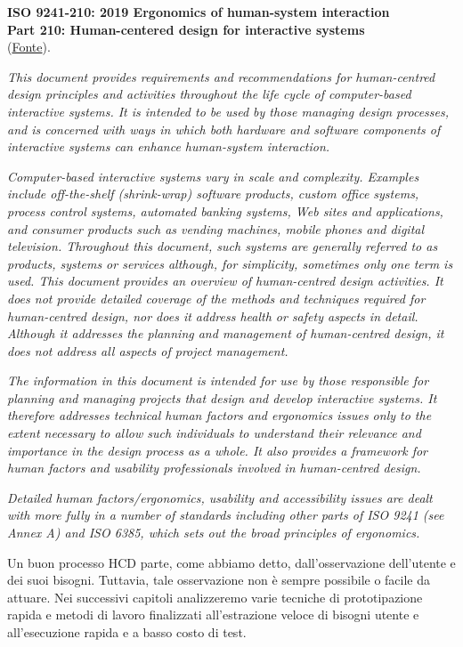 \vspace{\baselineskip}
\textbf{ISO 9241-210: 2019 Ergonomics of human-system interaction \\Part 210: Human-centered design for interactive systems}
\\(\href{https://www.iso.org/standard/77520.html}{Fonte}).
\vspace{\baselineskip}

\textit{This document provides requirements and recommendations for human-centred design principles and activities throughout the life cycle of
computer-based interactive systems. It is intended to be used by those managing design processes, and is concerned with ways in which both hardware
and software components of interactive systems can enhance human-system interaction.}

\textit{Computer-based interactive systems vary in scale and complexity. Examples include off-the-shelf (shrink-wrap) software products, custom office
systems, process control systems, automated banking systems, Web sites and applications, and consumer products such as vending machines, mobile phones
and digital television. Throughout this document, such systems are generally referred to as products, systems or services although, for simplicity,
sometimes only one term is used. This document provides an overview of human-centred design activities. It does not provide detailed coverage of the
methods and techniques required for human-centred design, nor does it address health or safety aspects in detail. Although it addresses the planning
and management of human-centred design, it does not address all aspects of project management. }

\textit{The information in this document is intended for use by those responsible for planning and managing projects that design and develop interactive
systems. It therefore addresses technical human factors and ergonomics issues only to the extent necessary to allow such individuals to understand their
relevance and importance in the design process as a whole. It also provides a framework for human factors and usability professionals involved in
human-centred design.}

\textit{Detailed human factors/ergonomics, usability and accessibility issues are dealt with more fully in a number of standards including other parts
of ISO 9241 (see Annex A) and ISO 6385, which sets out the broad principles of ergonomics.}

Un buon processo HCD parte, come abbiamo detto, dall'osservazione dell'utente e dei suoi bisogni. Tuttavia, tale osservazione non è sempre possibile o
facile da attuare. Nei successivi capitoli analizzeremo varie tecniche di prototipazione rapida e metodi di lavoro finalizzati all'estrazione veloce di
bisogni utente e all'esecuzione rapida e a basso costo di test. 

